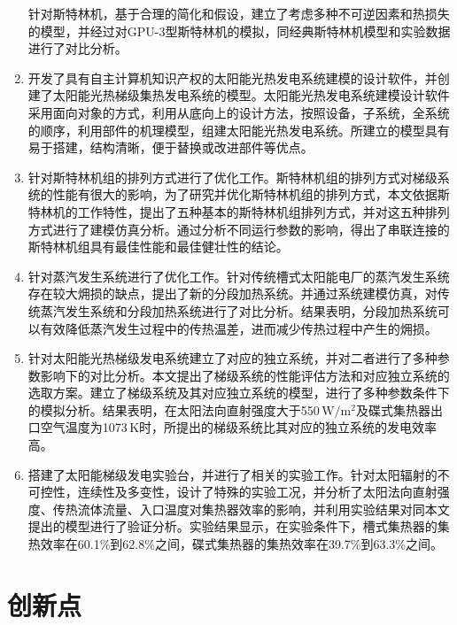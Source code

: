 \begin{enumerate}[label=(\arabic*)]
  针对斯特林机，基于合理的简化和假设，建立了考虑多种不可逆因素和热损失的模型，并经过对GPU-3型斯特林机的模拟，同经典斯特林机模型和实验数据进行了对比分析。
  \item 开发了具有自主计算机知识产权的太阳能光热发电系统建模的设计软件，并创建了太阳能光热梯级集热发电系统的模型。太阳能光热发电系统建模设计软件采用面向对象的方式，利用从底向上的设计方法，按照设备，子系统，全系统的顺序，利用部件的机理模型，组建太阳能光热发电系统。所建立的模型具有易于搭建，结构清晰，便于替换或改进部件等优点。
  \item 针对斯特林机组的排列方式进行了优化工作。斯特林机组的排列方式对梯级系统的性能有很大的影响，为了研究并优化斯特林机组的排列方式，本文依据斯特林机的工作特性，提出了五种基本的斯特林机组排列方式，并对这五种排列方式进行了建模仿真分析。通过分析不同运行参数的影响，得出了串联连接的斯特林机组具有最佳性能和最佳健壮性的结论。
  \item 针对蒸汽发生系统进行了优化工作。针对传统槽式太阳能电厂的蒸汽发生系统存在较大㶲损的缺点，提出了新的分段加热系统。并通过系统建模仿真，对传统蒸汽发生系统和分段加热系统进行了对比分析。结果表明，分段加热系统可以有效降低蒸汽发生过程中的传热温差，进而减少传热过程中产生的㶲损。
  \item 针对太阳能光热梯级发电系统建立了对应的独立系统，并对二者进行了多种参数影响下的对比分析。本文提出了梯级系统的性能评估方法和对应独立系统的选取方案。建立了梯级系统及其对应独立系统的模型，进行了多种参数条件下的模拟分析。结果表明，在太阳法向直射强度大于550\,$\mathrm{W/m^2}$及碟式集热器出口空气温度为1073$\,\mathrm{K}$时，所提出的梯级系统比其对应的独立系统的发电效率高。
	\item 搭建了太阳能梯级发电实验台，并进行了相关的实验工作。针对太阳辐射的不可控性，连续性及多变性，设计了特殊的实验工况，并分析了太阳法向直射强度、传热流体流量、入口温度对集热器效率的影响，并利用实验结果对同本文提出的模型进行了验证分析。实验结果显示，在实验条件下，槽式集热器的集热效率在60.1\%到62.8\%之间，碟式集热器的集热效率在39.7\%到63.3\%之间。
\end{enumerate}

\section{创新点}

